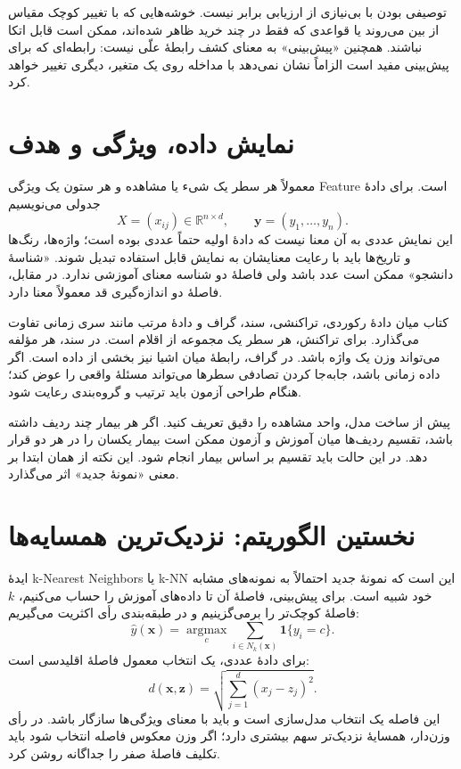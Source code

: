 توصیفی بودن با بی‌نیازی از ارزیابی برابر نیست. خوشه‌هایی که با تغییر کوچک مقیاس از بین می‌روند یا قواعدی که فقط در چند خرید ظاهر شده‌اند، ممکن است قابل اتکا نباشند. همچنین «پیش‌بینی» به معنای کشف رابطهٔ علّی نیست: رابطه‌ای که برای پیش‌بینی مفید است الزاماً نشان نمی‌دهد با مداخله روی یک متغیر، دیگری تغییر خواهد کرد.

\section{نمایش داده، ویژگی و هدف}
معمولاً هر سطر یک شیء یا مشاهده و هر ستون یک ویژگی Feature است. برای دادهٔ جدولی می‌نویسیم
\[X=(x_{ij})\in\mathbb R^{n\times d},\qquad \mathbf y=(y_1,\ldots,y_n).\]
این نمایش عددی به آن معنا نیست که دادهٔ اولیه حتماً عددی بوده است؛ واژه‌ها، رنگ‌ها و تاریخ‌ها باید با رعایت معنایشان به نمایش قابل استفاده تبدیل شوند. «شناسهٔ دانشجو» ممکن است عدد باشد ولی فاصلهٔ دو شناسه معنای آموزشی ندارد. در مقابل، فاصلهٔ دو اندازه‌گیری قد معمولاً معنا دارد.

کتاب میان دادهٔ رکوردی، تراکنشی، سند، گراف و دادهٔ مرتب مانند سری زمانی تفاوت می‌گذارد. برای تراکنش، هر سطر یک مجموعه از اقلام است. در سند، هر مؤلفه می‌تواند وزن یک واژه باشد. در گراف، رابطهٔ میان اشیا نیز بخشی از داده است. اگر داده زمانی باشد، جابه‌جا کردن تصادفی سطرها می‌تواند مسئلهٔ واقعی را عوض کند؛ هنگام طراحی آزمون باید ترتیب و گروه‌بندی رعایت شود.

پیش از ساخت مدل، واحد مشاهده را دقیق تعریف کنید. اگر هر بیمار چند ردیف داشته باشد، تقسیم ردیف‌ها میان آموزش و آزمون ممکن است بیمار یکسان را در هر دو قرار دهد. در این حالت باید تقسیم بر اساس بیمار انجام شود. این نکته از همان ابتدا بر معنی «نمونهٔ جدید» اثر می‌گذارد.

\section{نخستین الگوریتم: نزدیک‌ترین همسایه‌ها}
ایدهٔ k-Nearest Neighbors یا k-NN این است که نمونهٔ جدید احتمالاً به نمونه‌های مشابه خود شبیه است. برای پیش‌بینی، فاصلهٔ آن تا داده‌های آموزش را حساب می‌کنیم، $k$ فاصلهٔ کوچک‌تر را برمی‌گزینیم و در طبقه‌بندی رأی اکثریت می‌گیریم:
\[\widehat y(\mathbf x)=\underset{c}{\operatorname{argmax}}\sum_{i\in N_k(\mathbf x)}\mathbf1\{y_i=c\}.\]
برای دادهٔ عددی، یک انتخاب معمول فاصلهٔ اقلیدسی است:
\[d(\mathbf x,\mathbf z)=\sqrt{\sum_{j=1}^d(x_j-z_j)^2}.\]
این فاصله یک انتخاب مدل‌سازی است و باید با معنای ویژگی‌ها سازگار باشد. در رأی وزن‌دار، همسایهٔ نزدیک‌تر سهم بیشتری دارد؛ اگر وزن معکوس فاصله انتخاب شود باید تکلیف فاصلهٔ صفر را جداگانه روشن کرد.


